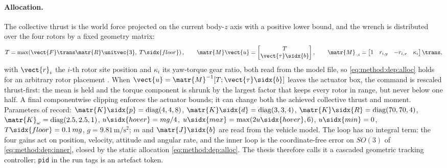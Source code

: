 \paragraph{Allocation.} The collective thrust is the world force projected on the current body-$z$
axis with a positive lower bound, and the wrench is distributed over the
four rotors by a fixed geometry matrix:
\begin{equation}\label{eq:method:dep:alloc}
  T = \max\!\left(\vect{F}\trans\matr{R}\unitvec{3},\;T\sidx{floor}\right),
  \qquad
  \matr{M}\vect{u} = \begin{bmatrix}T\\ \vect{\tau}\sidx{b}\end{bmatrix},
  \qquad
  \matr{M}_{:,i} = \begin{bmatrix}1 & r_{i,y} & -r_{i,x} & \kappa_{i}\end{bmatrix}\trans,
\end{equation}
with $\vect{r}_{i}$ the $i$-th rotor site position and $\kappa_{i}$ its yaw-torque gear ratio, both
read from the model file, so \eqref{eq:method:dep:alloc} holds for an arbitrary rotor placement
\parencite[Eq.~(1)]{lee2010geometric}\parencite{mellinger2011minimum}. When
$\vect{u} = \matr{M}^{-1}[T;\vect{\tau}\sidx{b}]$ leaves the actuator box, the command is rescaled
thrust-first: the mean is held and the torque component is shrunk by the largest factor that keeps
every rotor in range, but never below one half. A final componentwise clipping enforces the actuator
bounds; it can change both the achieved collective thrust and moment. Parameters of record:
$\matr{K}\sidx{p} = \operatorname{diag}(4,4,8)$, $\matr{K}\sidx{d} = \operatorname{diag}(3,3,4)$,
$\matr{K}\sidx{R} = \operatorname{diag}(70,70,4)$, $\matr{K}_{\omega} = \operatorname{diag}(2.5,2.5,1)$,
$u\sidx{hover} = mg/4$, $u\sidx{max} = \max(2u\sidx{hover},6)$, $u\sidx{min} = 0$,
$T\sidx{floor} = 0.1\,mg$, $g = 9.81\,\textrm{m}/\textrm{s}^{2}$; $m$ and $\matr{J}\sidx{b}$ are
read from the vehicle model.
The loop has no integral term: the four gains act on position, velocity, attitude and angular rate,
and the inner loop is the coordinate-free error on $SO(3)$ of \eqref{eq:method:dep:inner}, closed by
the static allocation \eqref{eq:method:dep:alloc}. The thesis therefore calls it a cascaded geometric
tracking controller; \texttt{pid} in the run tags is an artefact token.

